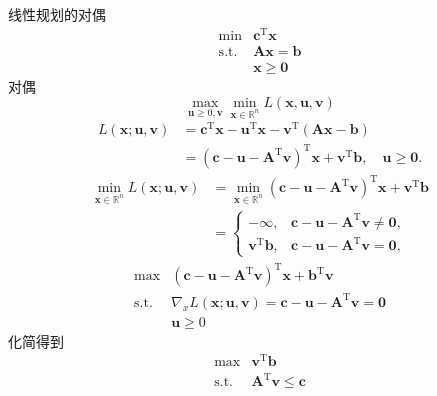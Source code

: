\begin{example}
    线性规划的对偶
    \[
        \begin{array}{rl}
            \min & \boldsymbol{c}^\mathrm{T}\boldsymbol{x}\\
            \mathrm{s.t.} & \boldsymbol{Ax}=\boldsymbol{b}\\
            & \boldsymbol{x}\geqslant\boldsymbol{0}
        \end{array}
    \]
    对偶
    \[
        \max_{\boldsymbol{u}\geq0,\boldsymbol{v}}\min_{\boldsymbol{x}\in \mathbb{R}^n}L(\boldsymbol{x},\boldsymbol{u},\boldsymbol{v})
    \]
    \[
        \begin{aligned}
            L(\boldsymbol{x};\boldsymbol{u},\boldsymbol{v})&=\boldsymbol{c}^\mathrm{T}\boldsymbol{x}-\boldsymbol{u}^\mathrm{T}\boldsymbol{x}-\boldsymbol{v}^\mathrm{T}(\boldsymbol{A}\boldsymbol{x}-\boldsymbol{b})\\
            &=\left(\boldsymbol{c}-\boldsymbol{u}-\boldsymbol{A}^\mathrm{T}\boldsymbol{v}\right)^\mathrm{T}\boldsymbol{x}+\boldsymbol{v}^\mathrm{T}\boldsymbol{b},\quad\boldsymbol{u}\geqslant\boldsymbol{0}.
        \end{aligned}
    \]
    \[
        \begin{aligned}
            \min_{\boldsymbol{x}\in\mathbb{R}^n}L(\boldsymbol{x};\boldsymbol{u},\boldsymbol{v})&=\min_{\boldsymbol{x}\in\mathbb{R}^n}\left(\boldsymbol{c}-\boldsymbol{u}-\boldsymbol{A}^\mathrm{T}\boldsymbol{v}\right)^\mathrm{T}\boldsymbol{x}+\boldsymbol{v}^\mathrm{T}\boldsymbol{b}\\
            &=\begin{cases}
                -\infty, & \boldsymbol{c}-\boldsymbol{u}-\boldsymbol{A}^\mathrm{T}\boldsymbol{v}\neq \boldsymbol{0} ,\\
                \boldsymbol{v}^\mathrm{T}\boldsymbol{b},& \boldsymbol{c}-\boldsymbol{u}-\boldsymbol{A}^\mathrm{T}\boldsymbol{v}= \boldsymbol{0},
            \end{cases}
        \end{aligned}
    \]
    \[
        \begin{array}{rl}
            \max & (\boldsymbol{c}-\boldsymbol{u}-\boldsymbol{A}^\mathrm{T}\boldsymbol{v})^\mathrm{T}\boldsymbol{x}+\boldsymbol{b}^\mathrm{T}\boldsymbol{v}  \\
            \mathrm{s.t.} & \nabla_{x}L(\boldsymbol{x};\boldsymbol{u},\boldsymbol{v})=\boldsymbol{c}-\boldsymbol{u}-\boldsymbol{A}^{\mathrm{T}}\boldsymbol{v}=\boldsymbol{0}  \\
            &\boldsymbol{u}\geqslant 0
        \end{array}
    \]
    化简得到
    \[
        \begin{array}{rl}
            \max&\boldsymbol{v}^\mathrm{T}\boldsymbol{b}\\
            \mathrm{s.t.}&\boldsymbol{A}^\mathrm{T}\boldsymbol{v}\leqslant \boldsymbol{c}
        \end{array}
    \]
\end{example}
